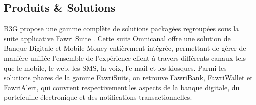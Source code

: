 








\subsection{Produits \& Solutions}

\hspace{\parindent}B3G propose une gamme complète de solutions packagées regroupées sous la suite applicative Fawri Suite \cite{ref2}. Cette suite Omnicanal offre une solution de Banque Digitale et Mobile Money entièrement intégrée, permettant de gérer de manière unifiée l'ensemble de l'expérience client à travers différents canaux tels que le mobile, le web, les SMS, la voix, l'e-mail et les kiosques. Parmi les solutions phares de la gamme FawriSuite, on retrouve FawriBank, FawriWallet et FawriAlert, qui couvrent respectivement les aspects de la banque digitale, du portefeuille électronique et des notifications transactionnelles.

